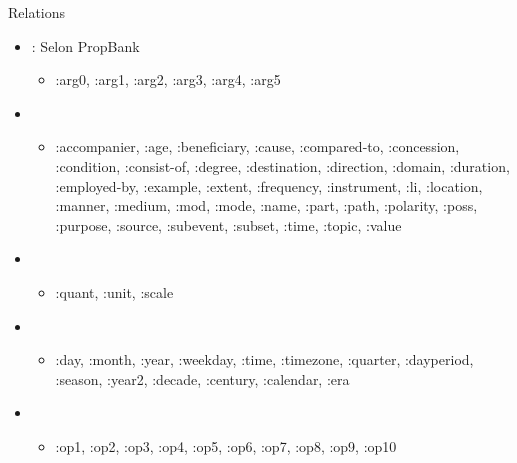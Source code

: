 \documentclass{KodeBook}
\begin{document}
Relations
\begin{itemize}
	\item {} : Selon PropBank
	\begin{itemize}
		\item :arg0, :arg1, :arg2, :arg3, :arg4, :arg5
	\end{itemize}
	\item {}
	\begin{itemize}
		\item :accompanier, :age, :beneficiary, :cause, :compared-to, :concession, :condition, :consist-of, :degree, :destination, :direction, :domain, :duration, :employed-by, :example, :extent, :frequency, :instrument, :li, :location, :manner, :medium, :mod, :mode, :name, :part, :path, :polarity, :poss, :purpose, :source, :subevent, :subset, :time, :topic, :value
	\end{itemize}
	\item {}
	\begin{itemize}
		\item :quant, :unit, :scale
	\end{itemize}
	\item {}
	\begin{itemize}
		\item :day, :month,
		:year, :weekday, :time, :timezone, :quarter,
		:dayperiod, :season, :year2, :decade, :century,
		:calendar, :era
	\end{itemize}
	\item {}
	\begin{itemize}
		\item :op1, :op2, :op3, :op4, :op5,
		:op6, :op7, :op8, :op9, :op10
	\end{itemize}
\end{itemize}







\begin{discussion}



\end{discussion}

\ifx\wholebook\relax\else
% 
% 
	
\end{document}
